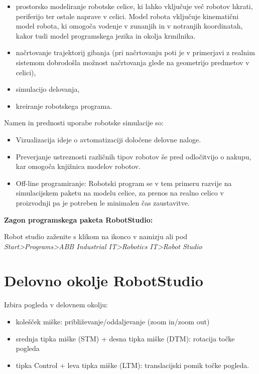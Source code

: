 \begin{itemize}
\item\vspace*{-0.35cm} prostorsko modeliranje robotske celice, ki
lahko vključuje več robotov hkrati, periferijo ter ostale naprave v
celici. Model robota vključuje kinematični model robota, ki omogoča
vodenje v zunanjih in v notranjih koordinatah, kakor tudi model
programskega jezika in okolja krmilnika. \item\vspace*{-0.35cm}
načrtovanje trajektorij gibanja (pri načrtovanju poti je v primerjavi
z realnim sistemom dobrodošla možnost načrtovanja glede na geometrijo
predmetov v celici), \item\vspace*{-0.35cm} simulacijo delovanja,
\item\vspace*{-0.35cm} kreiranje robotskega programa.
\end{itemize} Namen in prednosti uporabe robotske simulacije
so:
\begin{itemize}
\item\vspace*{-0.35cm} Vizualizacija ideje o avtomatizaciji določene
delovne naloge. \item\vspace*{-0.35cm} Preverjanje ustreznosti
različnih tipov robotov še pred odločitvijo o nakupu, kar omogoča
knjižnica modelov robotov. \item\vspace*{-0.35cm} Off-line
programiranje: Robotski program se v tem primeru razvije na
simulacijskem paketu na modelu celice, za prenos na realno celico v
proizvodnji pa je potreben le minimalen čas zaustavitve.
\end{itemize}

\vspace{15mm}

{\bf Zagon programskega paketa RobotStudio:}

\noindent Robot studio zaženite s klikom na ikonco v namizju ali
pod
\newline \textit{Start>Programs>ABB Industrial IT>Robotics IT>Robot
Studio}

\newpage
\section{Delovno okolje RobotStudio}

Izbira pogleda v delovnem okolju:
\begin{itemize}
\item\vspace*{-0.35cm} kolešček miške: približevanje/oddaljevanje
(zoom in/zoom out)

\item \vspace*{-0.35cm} srednja tipka miške (STM) + desna tipka miške
(DTM): rotacija točke pogleda

\item \vspace*{-0.35cm} tipka Control + leva tipka miške (LTM):
translacijski pomik točke pogleda.
\end{itemize}

